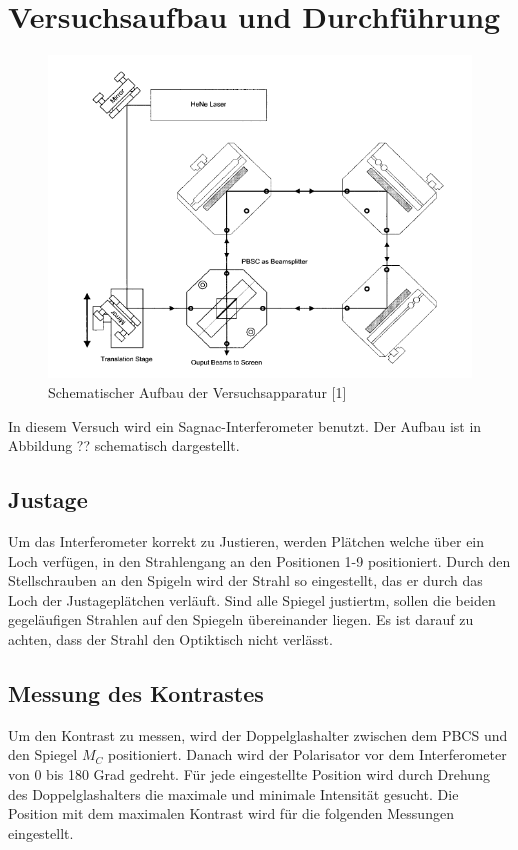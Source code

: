 \section{Versuchsaufbau und Durchführung}

\begin{figure}[h]
\centering
\includegraphics[scale=0.8]{./Interferometrie/img/aufbau.png}
\caption{Schematischer Aufbau der Versuchsapparatur [1]}
\label{aufbau}
\end{figure}


In diesem Versuch wird ein Sagnac-Interferometer benutzt. Der Aufbau ist in Abbildung ?? schematisch dargestellt.

\subsection{Justage}
Um das Interferometer korrekt zu Justieren, werden Plätchen welche über ein Loch verfügen, in den Strahlengang an den Positionen 1-9 positioniert. Durch den Stellschrauben an den Spigeln wird der Strahl
so eingestellt, das er durch das Loch der Justageplätchen verläuft. Sind alle Spiegel justiertm, sollen die beiden gegeläufigen Strahlen auf den Spiegeln übereinander liegen.
Es ist darauf zu achten, dass der Strahl den Optiktisch nicht verlässt.


\subsection{Messung des Kontrastes}
Um den Kontrast zu messen, wird der Doppelglashalter zwischen dem PBCS und den Spiegel $M_C$ positioniert. Danach wird der Polarisator vor dem Interferometer
von 0 bis 180 Grad gedreht. Für jede eingestellte Position wird durch Drehung des Doppelglashalters die maximale und minimale Intensität gesucht.
Die Position mit dem maximalen Kontrast wird für die folgenden Messungen eingestellt.

